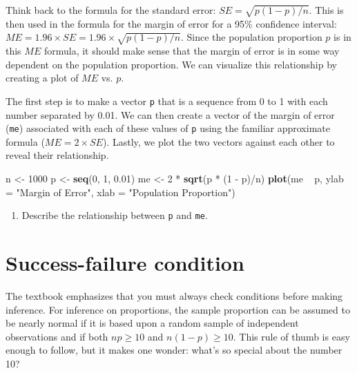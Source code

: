 \documentclass[]{book}
\newenvironment{Shaded}{\begin{snugshade}}{\end{snugshade}}
\newcommand{\KeywordTok}[1]{\textcolor[rgb]{0.13,0.29,0.53}{\textbf{{#1}}}}
\newcommand{\DataTypeTok}[1]{\textcolor[rgb]{0.13,0.29,0.53}{{#1}}}
\newcommand{\DecValTok}[1]{\textcolor[rgb]{0.00,0.00,0.81}{{#1}}}
\newcommand{\FloatTok}[1]{\textcolor[rgb]{0.00,0.00,0.81}{{#1}}}
\newcommand{\StringTok}[1]{\textcolor[rgb]{0.31,0.60,0.02}{{#1}}}
\newcommand{\NormalTok}[1]{{#1}}
\providecommand{\tightlist}{%
  \setlength{\itemsep}{0pt}\setlength{\parskip}{0pt}}
\theoremstyle{definition}
\theoremstyle{definition}
\theoremstyle{remark}
\begin{document}
Think back to the formula for the standard error:
\(SE = \sqrt{p(1-p)/n}\). This is then used in the formula for the
margin of error for a 95\% confidence interval:
\(ME = 1.96\times SE = 1.96\times\sqrt{p(1-p)/n}\). Since the population
proportion \(p\) is in this \(ME\) formula, it should make sense that
the margin of error is in some way dependent on the population
proportion. We can visualize this relationship by creating a plot of
\(ME\) vs. \(p\).

The first step is to make a vector \texttt{p} that is a sequence from 0
to 1 with each number separated by 0.01. We can then create a vector of
the margin of error (\texttt{me}) associated with each of these values
of \texttt{p} using the familiar approximate formula
(\(ME = 2 \times SE\)). Lastly, we plot the two vectors against each
other to reveal their relationship.

\begin{Shaded}
\begin{Highlighting}[]
\NormalTok{n <-}\StringTok{ }\DecValTok{1000}
\NormalTok{p <-}\StringTok{ }\KeywordTok{seq}\NormalTok{(}\DecValTok{0}\NormalTok{, }\DecValTok{1}\NormalTok{, }\FloatTok{0.01}\NormalTok{)}
\NormalTok{me <-}\StringTok{ }\DecValTok{2} \NormalTok{*}\StringTok{ }\KeywordTok{sqrt}\NormalTok{(p *}\StringTok{ }\NormalTok{(}\DecValTok{1} \NormalTok{-}\StringTok{ }\NormalTok{p)/n)}
\KeywordTok{plot}\NormalTok{(me ~}\StringTok{ }\NormalTok{p, }\DataTypeTok{ylab =} \StringTok{"Margin of Error"}\NormalTok{, }\DataTypeTok{xlab =} \StringTok{"Population Proportion"}\NormalTok{)}
\end{Highlighting}
\end{Shaded}

\begin{enumerate}
\def\labelenumi{\arabic{enumi}.}
\setcounter{enumi}{7}
\tightlist
\item
  Describe the relationship between \texttt{p} and \texttt{me}.
\end{enumerate}

\section*{Success-failure condition}\label{success-failure-condition}

The textbook emphasizes that you must always check conditions before
making inference. For inference on proportions, the sample proportion
can be assumed to be nearly normal if it is based upon a random sample
of independent observations and if both \(np \geq 10\) and
\(n(1 - p) \geq 10\). This rule of thumb is easy enough to follow, but
it makes one wonder: what's so special about the number 10?
\end{document}
